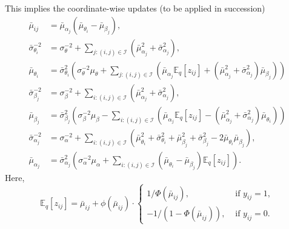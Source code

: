 \documentclass[12pt]{article}
\newcommand{\E}{\mathbb{E}}
\begin{document}
This implies the coordinate-wise updates (to be applied in succession)
\begin{align*}
        \bar{\mu}_{ij}
            &= \bar{\mu}_{\alpha_j}(\bar{\mu}_{\theta_i} - \bar{\mu}_{\beta_j}), \\
        \bar{\sigma}_{\theta_i}^{-2}
            &= \sigma_{\theta}^{-2} + \sum_{j: (i, j) \in \mathscr{I}} (\bar{\mu}_{\alpha_j}^2 + \bar{\sigma}_{\alpha_j}^2), \\
        \bar{\mu}_{\theta_i}
            &= \bar{\sigma}_{\theta_i}^2\left(\sigma_\theta^{-2}\mu_\theta + \sum_{j: (i, j) \in \mathscr{I}} (\bar{\mu}_{\alpha_j}\E_q[z_{ij}] + (\bar{\mu}_{\alpha_j}^2 + \bar{\sigma}_{\alpha_j}^2)\bar{\mu}_{\beta_j})\right) \\
        \bar{\sigma}_{\beta_j}^{-2}
            &= \sigma_{\beta}^{-2} + \sum_{i: (i, j) \in \mathscr{I}} (\bar{\mu}_{\alpha_j}^2 + \bar{\sigma}_{\alpha_j}^2), \\
        \bar{\mu}_{\beta_j}
            &= \bar{\sigma}_{\beta_j}^2\left(\sigma_{\beta}^{-2}\mu_\beta - \sum_{i: (i, j) \in \mathscr{I}} (\bar{\mu}_{\alpha_j}\E_q[z_{ij}] - (\bar{\mu}_{\alpha_j}^2 + \bar{\sigma}_{\alpha_j}^2)\bar{\mu}_{\theta_i})\right) \\
        \bar{\sigma}_{\alpha_j}^{-2}
            &= \sigma_{\alpha}^{-2} + \sum_{i: (i, j) \in \mathscr{I}} (\bar{\mu}_{\theta_i}^2 + \bar{\sigma}_{\theta_i}^2 + \bar{\mu}_{\beta_j}^2 + \bar{\sigma}_{\beta_j}^2 - 2\bar{\mu}_{\theta_i}\bar{\mu}_{\beta_j}), \\
        \bar{\mu}_{\alpha_j}
            &= \bar{\sigma}_{\alpha_j}^2\left(\sigma_{\alpha}^{-2}\mu_\alpha + \sum_{i: (i, j) \in \mathscr{I}} (\bar{\mu}_{\theta_i} - \bar{\mu}_{\beta_j})\E_q[z_{ij}]\right).
\end{align*}
Here, \[
    \E_q[z_{ij}] = \bar{\mu}_{ij} + \phi(\bar{\mu}_{ij})\cdot \begin{cases}
        1 /\Phi(\bar{\mu}_{ij}), &\text{ if } y_{ij} = 1, \\
        -1 / (1 - \Phi(\bar{\mu}_{ij})), &\text{ if } y_{ij} = 0.
    \end{cases}
\] 
\end{document}
